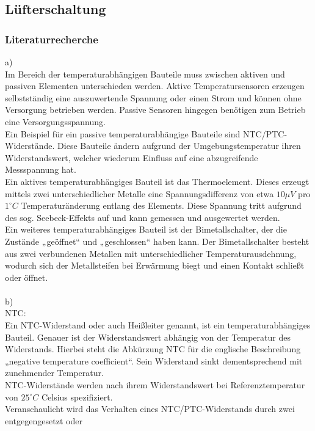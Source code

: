 \subsection{Lüfterschaltung}

\subsubsection{Literaturrecherche}

a)\\
Im Bereich der temperaturabhängigen Bauteile muss zwischen aktiven und passiven Elementen
unterschieden werden. Aktive Temperatursensoren erzeugen selbstständig eine auszuwertende
Spannung oder einen Strom und können ohne Versorgung betrieben werden. Passive Sensoren
hingegen benötigen zum Betrieb eine Versorgungsspannung.\\
Ein Beispiel für ein passive temperaturabhängige Bauteile sind NTC/PTC-Widerstände. Diese Bauteile
ändern aufgrund der Umgebungstemperatur ihren Widerstandswert, welcher wiederum Einfluss auf
eine abzugreifende Messspannung hat.\\
Ein aktives temperaturabhängiges Bauteil ist das Thermoelement. Dieses erzeugt mittels zwei
unterschiedlicher Metalle eine Spannungsdifferenz von etwa $10 \mu V$ pro $1^{\circ} C$ Temperaturänderung
entlang des Elements. Diese Spannung tritt aufgrund des sog. Seebeck-Effekts auf und kann
gemessen und ausgewertet werden.\\
Ein weiteres temperaturabhängiges Bauteil ist der Bimetallschalter, der die Zustände „geöffnet“ und
„geschlossen“ haben kann. Der Bimetallschalter besteht aus zwei verbundenen Metallen mit
unterschiedlicher Temperaturausdehnung, wodurch sich der Metallsteifen bei Erwärmung biegt und
einen Kontakt schließt oder öffnet.\\
\\
b) \\
NTC:\\
Ein NTC-Widerstand oder auch Heißleiter genannt, ist ein temperaturabhängiges Bauteil. Genauer ist
der Widerstandswert abhängig von der Temperatur des Widerstands. Hierbei steht die Abkürzung
NTC für die englische Beschreibung „negative temperature coefficient“. Sein Widerstand sinkt
dementsprechend mit zunehmender Temperatur.\\
NTC-Widerstände werden nach ihrem Widerstandswert bei Referenztemperatur von $25^{\circ} C$ Celsius
spezifiziert.\\
Veranschaulicht wird das Verhalten eines NTC/PTC-Widerstands durch zwei entgegengesetzt oder
